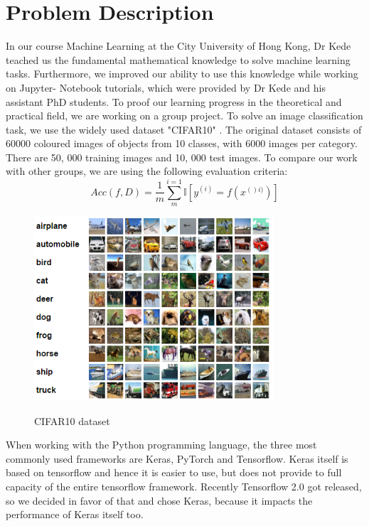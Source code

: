 \documentclass[journal]{IEEEtran}
\begin{document}
\section{Problem Description}
\label{sec:problemDescription}
In our course Machine Learning at the City University of Hong Kong, Dr Kede teached us the fundamental mathematical knowledge to solve machine learning tasks. Furthermore, we improved our ability to use this knowledge while working on Jupyter- Notebook tutorials, which were provided by Dr Kede and his assistant PhD students. To proof our learning progress in the theoretical and practical field, we are working on a group project. To solve an image classification task, we use the widely used dataset  "CIFAR10" \cite{echersly}\cite{mostpopular}. The original dataset consists of 60000 coloured images of objects from 10 classes, with 6000 images per category. There are 50, 000 training images and 10, 000 test images. To compare our work with other groups, we are using the following evaluation criteria:
\begin{equation}
Acc(f,D) = \frac{1}{m}\sum_{m}^{i=1} \mathbb{I} \left [ y^{(i)} =f(x^{()i)})\right ]
\label{acc}
\end{equation}

\begin{figure}
  \begin{center}
  \includegraphics[width=3.5in]{photo/image32.png}\\
  \caption{CIFAR10 dataset}\label{cifar10}
  \end{center}
\end{figure}


\noindent When working with the Python programming language, the three most commonly used frameworks are Keras, PyTorch and Tensorflow. Keras itself is based on tensorflow and hence it is easier to use, but does not provide to full capacity of the entire tensorflow framework. Recently Tensorflow 2.0 got released, so we decided in favor of that and chose Keras, because it impacts the performance of Keras itself too. 
\end{document}
